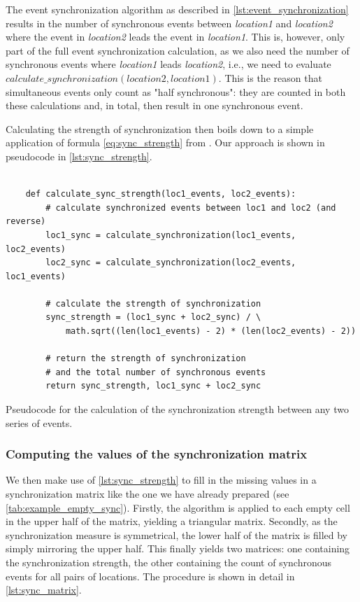 The event synchronization algorithm as described in \cref{lst:event_synchronization} results in the number of synchronous events between \textit{location1} and \textit{location2} where the event in \textit{location2} leads the event in \textit{location1}. This is, however, only part of the full event synchronization calculation, as we also need the number of synchronous events where \textit{location1} leads \textit{location2}, i.e., we need to evaluate $calculate\_synchronization(location2, location1)$. This is the reason that simultaneous events only count as "half synchronous": they are counted in both these calculations and, in total, then result in one synchronous event.

Calculating the strength of synchronization then boils down to a simple application of formula \eqref{eq:sync_strength} from \pageref{eq:sync_strength}. Our approach is shown in pseudocode in \cref{lst:sync_strength}.

\begin{listing}[H]
  \begin{verbatim}

    def calculate_sync_strength(loc1_events, loc2_events):
        # calculate synchronized events between loc1 and loc2 (and reverse)
        loc1_sync = calculate_synchronization(loc1_events, loc2_events)
        loc2_sync = calculate_synchronization(loc2_events, loc1_events)

        # calculate the strength of synchronization
        sync_strength = (loc1_sync + loc2_sync) / \
            math.sqrt((len(loc1_events) - 2) * (len(loc2_events) - 2))

        # return the strength of synchronization
        # and the total number of synchronous events
        return sync_strength, loc1_sync + loc2_sync

  \end{verbatim}
  \caption{Pseudocode for the calculation of the synchronization strength between any two series of events.}
  \label{lst:sync_strength}
\end{listing}

\subsubsection{Computing the values of the synchronization matrix}
We then make use of \cref{lst:sync_strength} to fill in the missing values in a synchronization matrix like the one we have already prepared (see \cref{tab:example_empty_sync}). Firstly, the algorithm is applied to each empty cell in the upper half of the matrix, yielding a triangular matrix. Secondly, as the synchronization measure is symmetrical, the lower half of the matrix is filled by simply mirroring the upper half. This finally yields two matrices: one containing the synchronization strength, the other containing the count of synchronous events for all pairs of locations. The procedure is shown in detail in \cref{lst:sync_matrix}.


